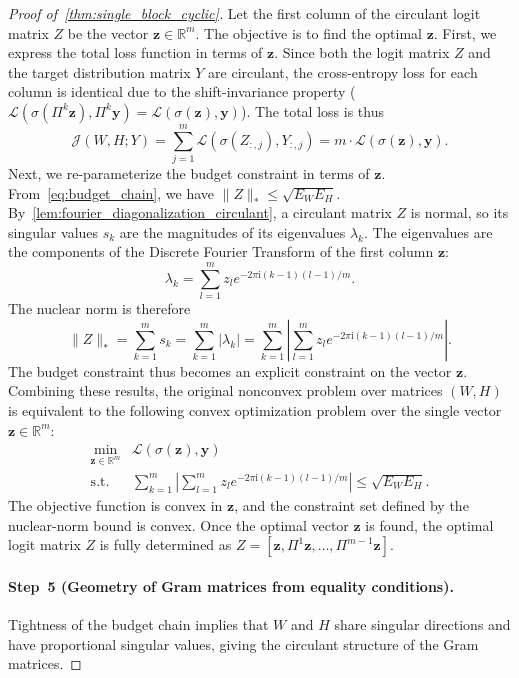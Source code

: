 \documentclass[11pt]{article}
\begin{document}
\begin{proof}[Proof of~\cref{thm:single_block_cyclic}]
Let the first column of the circulant logit matrix \(Z\) be the vector \(\boldsymbol{z}  \in \mathbb{R}^m\). The objective is to find the optimal \(\boldsymbol{z} \). First, we express the total loss function in terms of \(\boldsymbol{z} \). Since both the logit matrix \(Z\) and the target distribution matrix \(Y\) are circulant, the cross-entropy loss for each column is identical due to the shift-invariance property (\(\mathcal L(\sigma(\Pi^k\boldsymbol{z} ), \Pi^k\boldsymbol{y}) = \mathcal L(\sigma(\boldsymbol{z} ), \boldsymbol{y})\)). The total loss is thus
\[ \mathcal J(W,H;Y) = \sum_{j=1}^{m} \mathcal L(\sigma(Z_{:,j}), Y_{:,j}) = m \cdot \mathcal L(\sigma(\boldsymbol{z} ), \boldsymbol{y}). \]
Next, we re-parameterize the budget constraint in terms of \(\boldsymbol{z} \). From~\cref{eq:budget_chain}, we have \( \|Z\|_* \le \sqrt{E_W E_H} \). By~\cref{lem:fourier_diagonalization_circulant}, a circulant matrix \(Z\) is normal, so its singular values \(s_k\) are the magnitudes of its eigenvalues \(\lambda_k\). The eigenvalues are the components of the Discrete Fourier Transform of the first column \(\boldsymbol{z} \):
\[ \lambda_k = \sum_{l=1}^m z_{l} e^{-2\pi \mathrm{i} (k-1)(l-1)/m}. \]
The nuclear norm is therefore
\[ \|Z\|_* = \sum_{k=1}^m s_k = \sum_{k=1}^m |\lambda_k| = \sum_{k=1}^m \left| \sum_{l=1}^m z_{l} e^{-2\pi \mathrm{i} (k-1)(l-1)/m} \right|. \]
The budget constraint thus becomes an explicit constraint on the vector \(\boldsymbol{z} \).
Combining these results, the original nonconvex problem over matrices \((W,H)\) is equivalent to the following convex optimization problem over the single vector \(\boldsymbol{z}  \in \mathbb{R}^m\):
\[
\begin{aligned}
\min_{\boldsymbol{z} \in\mathbb R^{m}}
 & \mathcal L \left(\sigma(\boldsymbol{z} ), \boldsymbol{y}\right)
\\
\text{s.t. } & \sum_{k=1}^{m}\left| \sum_{l=1}^{m} z_{l} e^{-2\pi \mathrm{i} (k-1)(l-1)/m} \right| \le \sqrt{E_W E_H}.
\end{aligned}
\]
The objective function is convex in \(\boldsymbol{z} \), and the constraint set defined by the nuclear-norm bound is convex.
Once the optimal vector \(\boldsymbol{z} \) is found, the optimal logit matrix \(Z\) is fully determined as \(Z = [\boldsymbol{z} , \Pi^1\boldsymbol{z} , \dots, \Pi^{m-1}\boldsymbol{z} ]\).

\paragraph{Step~5 (Geometry of Gram matrices from equality conditions).} Tightness of the budget chain implies that \(W\) and \(H\) share singular directions and have proportional singular values, giving the circulant structure of the Gram matrices.


\end{proof}
\end{document}
